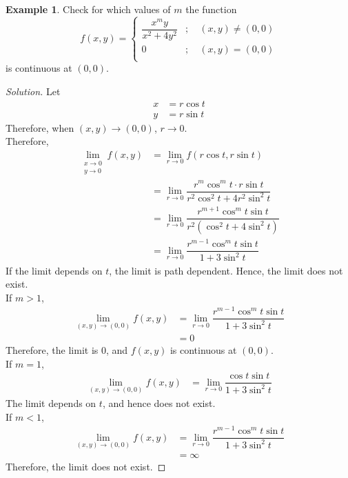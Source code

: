 \documentclass[fleqn, 12pt]{article}
\theoremstyle{definition}
\newtheorem{example}{Example}
\theoremstyle{theorem}
\newenvironment{solution}
{\begin{proof}[Solution]\let\qed\relax}
	{\end{proof}}
\begin{document}
\begin{example}
	Check for which values of $m$ the function
	\begin{equation*}
		f(x,y) =
			\begin{cases}
				\dfrac{x^m y}{x^2 + 4 y^2} &;\quad (x,y) \neq  (0,0)\\
				0 &;\quad (x,y) = (0,0)\\
			\end{cases}
	\end{equation*}
	is continuous at $(0,0)$.
\end{example}

\begin{solution}
	Let
	\begin{align*}
		x &= r \cos t\\
		y &= r \sin t
	\end{align*}
	Therefore, when $(x,y) \to (0,0)$, $r \to 0$.\\
	Therefore,
	\begin{align*}
		\lim\limits_{\substack{
			x \to 0\\
			y \to 0}} f(x,y) &= \lim\limits_{r \to 0} f(r \cos t, r \sin t)\\
		&= \lim\limits_{r \to 0} \dfrac{r^m \cos^m t \cdot r \sin t}{r^2 \cos^2 t + 4 r^2 \sin^2 t}\\
		&= \lim\limits_{r \to 0} \dfrac{r^{m+1} \cos^m t \sin t}{r^2 (\cos^2 t + 4 \sin^2 t)}\\
		&= \lim\limits_{r \to 0} \dfrac{r^{m-1} \cos^m t \sin t}{1 + 3 \sin^2 t}
	\end{align*}
	If the limit depends on $t$, the limit is path dependent. Hence, the limit does not exist.\\
	If $m > 1$,
	\begin{align*}
		\lim\limits_{(x,y) \to (0,0)} f(x,y) &= \lim\limits_{r \to 0} \dfrac{r^{m-1} \cos^m t \sin t}{1 + 3 \sin^2 t}\\
		&= 0
	\end{align*}
	Therefore, the limit is 0, and $f(x,y)$ is continuous at $(0,0)$.\\
	If $m = 1$,
	\begin{align*}
		\lim\limits_{(x,y) \to (0,0)} f(x,y) &= \lim\limits_{r \to 0} \dfrac{\cos t \sin t}{1 + 3 \sin^2 t}		
	\end{align*}
	The limit depends on $t$, and hence does not exist.\\
	If $m < 1$,
	\begin{align*}
		\lim\limits_{(x,y) \to (0,0)} f(x,y) &= \lim\limits_{r \to 0} \dfrac{r^{m-1} \cos^m t \sin t}{1 + 3 \sin^2 t}\\
		&= \infty
	\end{align*}
	Therefore, the limit does not exist.
\end{solution}
\end{document}

